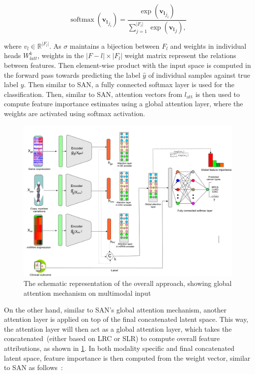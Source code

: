\begin{equation}
    \operatorname{softmax}\left(\boldsymbol{v_l}_{j_{i}}\right)=\frac{\exp \left(\boldsymbol{v_l}_{j_{i}}\right)}{\sum_{j=1}^{|F_l|} \exp \left(\boldsymbol{v_l}_{j}\right),}
\end{equation}

\hspace*{3.5mm} where $v_l \in \mathbb{R}^{|F_l|}$. As $\sigma$ maintains a bijection between $F_l$ and weights in individual heads $W_{latt}^{k}$, weights in the $|F-l| \times|F_l|$ weight matrix represent the relations between features. Then element-wise product with the input space is computed in the forward pass towards predicting the label $\hat{y}$ of individual samples against true label ${y}$. Then similar to SAN, a fully connected softmax layer is used for the classification. Then, similar to SAN, attention vectors from $l_{\text {att}}$ is then used to compute feature importance estimates using a global attention layer, where the weights are activated using softmax activation. 

\begin{figure}
	\centering
	\includegraphics[scale=0.8]{images/full_attention.png}
	\caption{The schematic representation of the overall approach, showing global attention mechanism on multimodal input}
	\label{fig:all_attention}
\end{figure}

\hspace*{3.5mm} On the other hand, similar to SAN's global attention mechanism, another attention layer is applied on top of the final concatenated latent space. This way, the attention layer will then act as a global attention layer, which takes the concatenated~(either based on LRC or SLR) to compute overall feature attributions, as shown in \cref{fig:all_attention}. In both modality specific and final concatenated latent space, feature importance is then computed from the weight vector, similar to SAN as follows~\cite{vaswani2017attention}:

